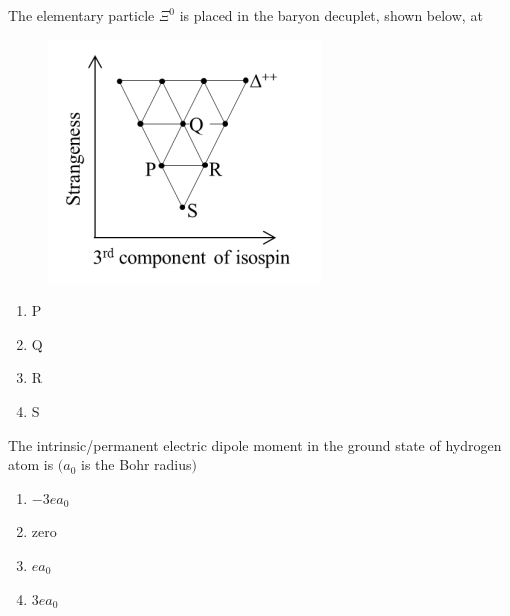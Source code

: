 \item The elementary particle $\Xi^0$ is placed in the baryon decuplet, shown below, at
\begin{figure}[!ht]
    \centering
    \includegraphics[scale=0.4]{GATE-yearwise/GATE(8)/figs/fig1.png}
    \caption{}
    \label{fig:50,51}
\end{figure}
\begin{multicols}{2}
\begin{enumerate}
    \item P
    \item Q
    \item R
    \item S
\end{enumerate}
\end{multicols}

\bigskip

\item The intrinsic/permanent electric dipole moment in the ground state of hydrogen atom is $(a_0$ is the Bohr radius$)$
\begin{multicols}{2}
\begin{enumerate}
    \item $-3 e a_0$
    \item zero
    \item $e a_0$
    \item $3 e a_0$
\end{enumerate}
\end{multicols}

\bigskip

